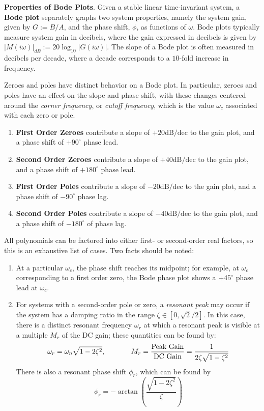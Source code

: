 \begin{shaded}
    \textbf{Properties of Bode Plots}. Given a stable linear time-invariant system, a \textbf{Bode plot} separately graphs two system properties, namely the system gain, given by $G:=B/A$, and the phase shift, $\phi$, as functions of $\omega$. Bode plots typically measure system gain in decibels, where the gain expressed in decibels is given by $|M(i\omega)|_{dB}:= 20\log_{10}|G(i\omega)|$. The slope of a Bode plot is often measured in decibels per decade, where a decade corresponds to a $10$-fold increase in frequency.
    
    Zeroes and poles have distinct behavior on a Bode plot. In particular, zeroes and poles have an effect on the slope and phase shift, with these changes centered around the \textit{corner frequency}, or \textit{cutoff frequency}, which is the value $\omega_c$ associated with each zero or pole.
    \vspace{-1em}
    \begin{enumerate}
        \item[] \textbf{First Order Zeroes} contribute a slope of $+20\text{dB/dec}$ to the gain plot, and a phase shift of $+90^\circ$ phase lead.
        \item[] \textbf{Second Order Zeroes} contribute a slope of $+40 \text{dB/dec}$ to the gain plot, and a phase shift of $+180^\circ$ phase lead.
        \item[] \textbf{First Order Poles} contribute a slope of $-20\text{dB/dec}$ to the gain plot, and a phase shift of $-90^\circ$ phase lag.
        \item[] \textbf{Second Order Poles} contribute a slope of $-40\text{dB/dec}$ to the gain plot, and a phase shift of $-180^\circ$ of phase lag.
    \end{enumerate}
    \vspace{-1em}
    All polynomials can be factored into either first- or second-order real factors, so this is an exhaustive list of cases. Two facts should be noted:
    \vspace{-1em}
    \begin{enumerate}
        \item[1.] At a particular $\omega_c$, the phase shift reaches its midpoint; for example, at $\omega_c$ corresponding to a first order zero, the Bode phase plot shows a $+45^\circ$ phase lead at $\omega_c$.
        \item[2.] For systems with a second-order pole or zero, a \textit{resonant peak} may occur if the system has a damping ratio in the range $\zeta\in [0,\sqrt{2}/2]$. In this case, there is a distinct resonant frequency $\omega_r$ at which a resonant peak is visible at a multiple $M_r$ of the DC gain; these quantities can be found by: \[\omega_r = \omega_n\sqrt{1-2\zeta^2},\hspace{0.5in} M_r = \frac{\text{Peak Gain}}{\text{DC Gain}} = \frac{1}{2\zeta\sqrt{1-\zeta^2}}\] There is also a resonant phase shift $\phi_r$, which can be found by \[\phi_r = -\arctan\left(\frac{\sqrt{1-2\zeta^2}}{\zeta}\right)\]
    \end{enumerate}
\end{shaded}

